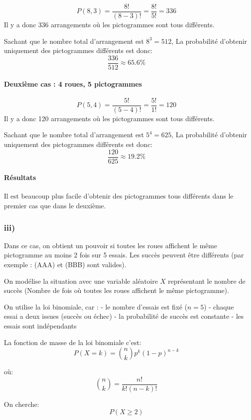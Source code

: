 \documentclass[11pt]{article}
\begin{document}
\[
P(8,3)=\frac{8!}{(8-3)!}=\frac{8!}{5!}=336
\] Il y a donc 336 arrangements où les pictogrammes sont tous
différents.

Sachant que le nombre total d'arrangement est \(8^3=512\), La
probabilité d'obtenir uniquement des pictogrammes différents est donc:
\[
\frac{336}{512} \approx 65.6\%
\]

\paragraph{Deuxième cas : 4 roues, 5
pictogrammes}\label{deuxiuxe8me-cas-4-roues-5-pictogrammes}

\[
P(5,4)=\frac{5!}{(5-4)!}=\frac{5!}{1!}=120
\] Il y a donc 120 arrangements où les pictogrammes sont tous
différents.

Sachant que le nombre total d'arrangement est \(5^4=625\), La
probabilité d'obtenir uniquement des pictogrammes différents est donc:
\[
\frac{120}{625} \approx 19.2\%
\]

\paragraph{Résultats}\label{ruxe9sultats}

Il est beaucoup plus facile d'obtenir des pictogrammes tous différents
dans le premier cas que dans le deuxième.

    \subsubsection{iii)}\label{iii}

Dans ce cas, on obtient un pouvoir si toutes les roues affichent le même
pictogramme au moins 2 fois sur 5 essais. Les succès peuvent être
différents (par exemple : (AAA) et (BBB) sont valides).

On modélise la situation avec une variable aléatoire \(X\) représentant
le nombre de succès (Nombre de fois où toutes les roues affichent le
même pictogramme).

On utilise la loi binomiale, car : - le nombre d'essais est fixé
(\(n = 5\)) - chaque essai a deux issues (succès ou échec) - la
probabilité de succès est constante - les essais sont indépendants

La fonction de masse de la loi binomiale c'est: \[
P(X=k)=\binom{n}{k} p^k (1-p)^{n-k}
\]

où: \[
\binom{n}{k}=\frac{n!}{k!(n-k)!}
\]

On cherche: \[
P(X \ge 2)
\]
\end{document}
